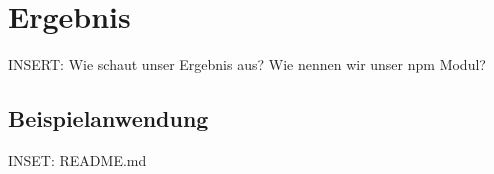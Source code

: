 \documentclass[hidelinks, a4paper, 11pt]{article} %
\begin{document}

\section{Ergebnis}

INSERT: Wie schaut unser Ergebnis aus? Wie nennen wir unser npm Modul?

\subsection{Beispielanwendung}

INSET: README.md


\renewcommand{\refname}{Referenzen}

\newpage



\end{document}
